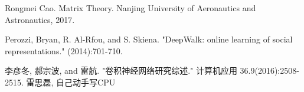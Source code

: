 \documentclass[12pt]{article} %
\begin{document}


\newpage

\begin{thebibliography}{9}


  Rongmei Cao.
  Matrix Theory.
  Nanjing University of Aeronautics and Astronautics, 2017.  

  Perozzi, Bryan, R. Al-Rfou, and S. Skiena. "DeepWalk: online learning of social representations." (2014):701-710.

  李彦冬, 郝宗波, and 雷航. "卷积神经网络研究综述." 计算机应用 36.9(2016):2508-2515.
  雷思磊, 自己动手写CPU
\end{thebibliography}
\end{document}
